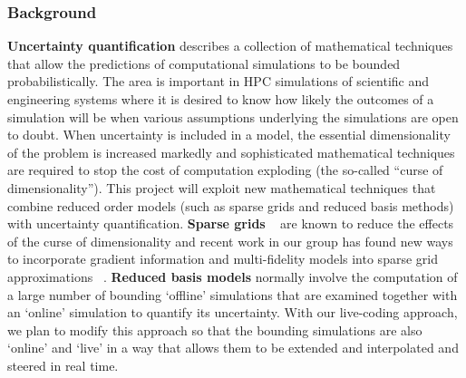 \subsubsection*{Background}

{\bf Uncertainty quantification} describes a collection of
mathematical techniques that allow the predictions of computational
simulations to be bounded probabilistically. The area is important in
HPC simulations of scientific and
engineering systems where it is desired to know how likely the
outcomes of a simulation will be when various assumptions underlying
the simulations are open to doubt. When uncertainty is included in a
model, the essential dimensionality of the problem is increased
markedly and sophisticated mathematical techniques are required
to stop the cost of
computation exploding (the so-called ``curse of dimensionality''). 
This project will exploit new mathematical techniques that
combine {reduced order models} (such as {sparse grids and reduced
basis methods}) with uncertainty quantification. {\bf Sparse grids}
~\parencite{BungartzGriebel2004} are known to reduce the effects of
the curse of dimensionality and recent work in our group has found new
ways to incorporate gradient information and multi-fidelity models
into sparse grid approximations
~\parencite{deBaarHarding2015,Jakeman2015,deBaarRDM2015}.  {\bf Reduced
basis models} normally involve the computation of a large number of bounding
`offline' simulations that are examined together with an `online'
simulation to quantify its uncertainty. With our live-coding approach,
we plan to modify this approach so that the bounding simulations are
also  `online' and `live' in a way that allows them to be extended and
interpolated and steered in real time.

\iffalse
When uncertainty is included into a model, the essential
dimensionality of the problem is increased markedly.  New and more
sophisticated techniques are then required to deal with the so called
`curse of dimensionality', where the cost of computation increases
exponentially with the dimension of the problem.  The mathematical
component of this project will be based on new developments combining
reduced order models (such as sparse grids and reduced basis methods)
with uncertainty quantification.  Sparse
grids~\parencite{BungartzGriebel2004} are known to reduce the effects
of the curse of dimensionality and recent work in our group has found
new ways to incorporate gradient information and multi-fidelity models
into sparse grid
approximations~\parencite{deBaarHarding2015,Jakeman2015,deBaarRDM2015}.
We will extend this work to construct efficient techniques for
incorporating uncertainty information into storm surge-tsunami models.
Reduced basis methods~\parencite{quarteroni2015reduced} provide an
alternative approach for constructing reduced order models and will
also be investigated.
\fi

